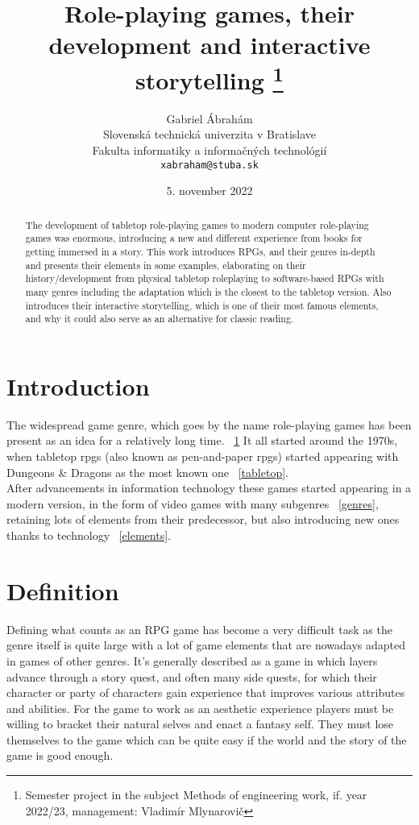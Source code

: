 \documentclass[10pt,twoside,english,a4paper]{article}
\title{Role-playing games, their development and interactive storytelling
\thanks{Semester project in the subject Methods of engineering work, if. year 2022/23, management: Vladimír Mlynarovič }}
\author{Gabriel Ábrahám\\[2pt]
	{\small Slovenská technická univerzita v Bratislave}\\
	{\small Fakulta informatiky a informačných technológií}\\
	{\small \texttt{xabraham@stuba.sk}}	
	}
\date{\small 5. november 2022}
\begin{document}
\maketitle

\begin{abstract} %
The development of tabletop role-playing games to modern computer role-playing games was enormous, introducing a new and different experience from books for getting immersed in a story. This work introduces RPGs, and their genres in-depth and presents their elements in some examples, elaborating on their history/development from physical tabletop roleplaying to software-based RPGs with many genres including the adaptation which is the closest to the tabletop version. Also introduces their interactive storytelling, which is one of their most famous elements, and why it could also serve as an alternative for classic reading.

\end{abstract}

\pagebreak

\section*{Introduction}
The widespread game genre, which goes by the name role-playing games has been present as an idea for a relatively long time. ~\ref{def} It all started around the 1970s, when tabletop rpgs (also known as pen-and-paper rpgs) started appearing with Dungeons \& Dragons as the most known one  ~\ref{tabletop}.\\
After advancements in information technology these games started appearing in a modern version, in the form of video games with many subgenres ~\ref{genres}, retaining lots of elements from their predecessor, but  also introducing new ones thanks to technology ~\ref{elements}.\\

\section{Definition} \label{def}
 Defining what counts as an RPG game has become a very difficult task as the genre itself is quite large with a lot of game elements that are nowadays adapted in games of other genres. It's generally described as \cite{CRPG} a game in which layers advance through a story quest, and often many side quests, for which their character or party of characters gain experience that improves various attributes and abilities. \cite{RPGs} For the game to work as an aesthetic experience players must be willing to bracket their natural selves and enact a fantasy self. They must lose themselves to the game which can be quite easy if the world and the story of the game is good enough.
\end{document}
